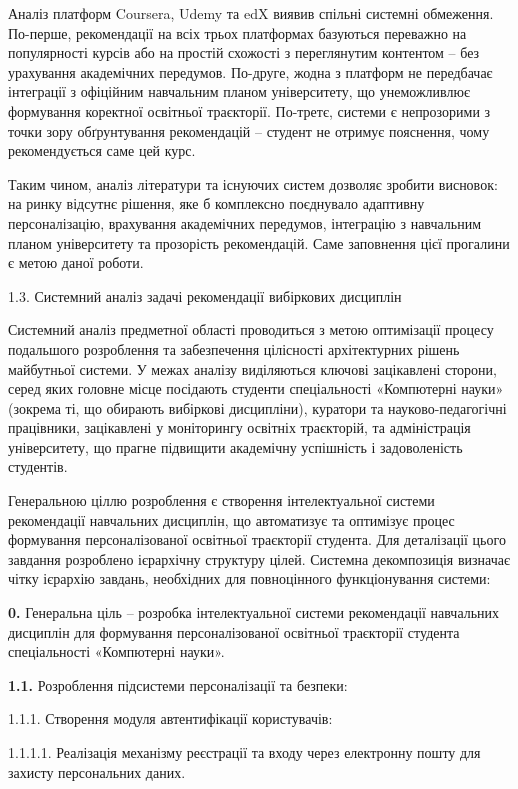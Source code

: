\documentclass[
]{article}
\begin{document}
Аналіз платформ Coursera, Udemy та edX виявив спільні системні
обмеження. По-перше, рекомендації на всіх трьох платформах базуються
переважно на популярності курсів або на простій схожості з переглянутим
контентом -- без урахування академічних передумов. По-друге, жодна з
платформ не передбачає інтеграції з офіційним навчальним планом
університету, що унеможливлює формування коректної освітньої траєкторії.
По-третє, системи є непрозорими з точки зору обґрунтування рекомендацій
-- студент не отримує пояснення, чому рекомендується саме цей курс.

Таким чином, аналіз літератури та існуючих систем дозволяє зробити
висновок: на ринку відсутнє рішення, яке б комплексно поєднувало
адаптивну персоналізацію, врахування академічних передумов, інтеграцію з
навчальним планом університету та прозорість рекомендацій. Саме
заповнення цієї прогалини є метою даної роботи.

\protect{}\label{_Toc230434081}{}1.3. Системний аналіз
задачі рекомендації вибіркових дисциплін

Системний аналіз предметної області проводиться з метою оптимізації
процесу подальшого розроблення та забезпечення цілісності архітектурних
рішень майбутньої системи. У межах аналізу виділяються ключові
зацікавлені сторони, серед яких головне місце посідають студенти
спеціальності «Комп\textquotesingle ютерні науки» (зокрема ті, що
обирають вибіркові дисципліни), куратори та науково-педагогічні
працівники, зацікавлені у моніторингу освітніх траєкторій, та
адміністрація університету, що прагне підвищити академічну успішність і
задоволеність студентів.

Генеральною ціллю розроблення є створення інтелектуальної системи
рекомендації навчальних дисциплін, що автоматизує та оптимізує процес
формування персоналізованої освітньої траєкторії студента. Для
деталізації цього завдання розроблено ієрархічну структуру цілей.
Системна декомпозиція визначає чітку ієрархію завдань, необхідних для
повноцінного функціонування системи:

\textbf{0.} Генеральна ціль -- розробка інтелектуальної системи
рекомендації навчальних дисциплін для формування персоналізованої
освітньої траєкторії студента спеціальності «Комп\textquotesingle ютерні
науки».

\textbf{1.1.} Розроблення підсистеми персоналізації та безпеки:

1.1.1. Створення модуля автентифікації користувачів:

1.1.1.1. Реалізація механізму реєстрації та входу через електронну пошту
для захисту персональних даних.
\end{document}
